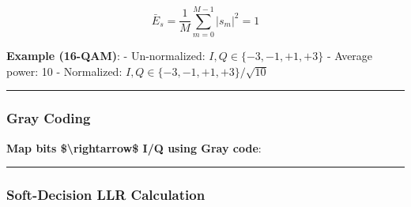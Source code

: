 \[
\bar{E}_s = \frac{1}{M}\sum_{m=0}^{M-1} |s_m|^2 = 1
\]

\textbf{Example (16-QAM)}: - Un-normalized:
\(I, Q \in \{-3, -1, +1, +3\}\) - Average power: 10 - Normalized:
\(I, Q \in \{-3, -1, +1, +3\}/\sqrt{10}\)

\begin{center}\rule{0.5\linewidth}{0.5pt}\end{center}

\subsubsection{Gray Coding}\label{gray-coding}

\textbf{Map bits \$\textbackslash rightarrow\$ I/Q using Gray code}:

\begin{Shaded}
\begin{Highlighting}[]
\OperatorTok{=}\NormalTok{ [}\NormalTok{, }\NormalTok{, }\NormalTok{, }\NormalTok{]  }
\OperatorTok{=}\NormalTok{ bits[}\NormalTok{:}\NormalTok{]}
\OperatorTok{=}\NormalTok{ bits[}\NormalTok{:}\NormalTok{]}
    
\OperatorTok{=}
\OperatorTok{=}
    
\OperatorTok{=} \OperatorTok{*}\OperatorTok{{-}}   
\OperatorTok{=} \OperatorTok{*}\OperatorTok{{-}} 
    
    \OperatorTok{+} \OperatorTok{*}
\end{Highlighting}
\end{Shaded}

\begin{center}\rule{0.5\linewidth}{0.5pt}\end{center}

\subsubsection{Soft-Decision LLR
Calculation}\label{soft-decision-llr-calculation}

